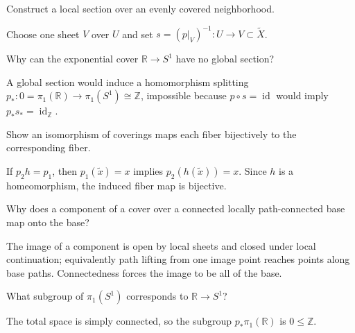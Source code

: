 \begin{problem}\label{prob:viii10-11}
Construct a local section over an evenly covered neighborhood.
\end{problem}
\begin{solution}
Choose one sheet \(V\) over \(U\) and set \(s=(p|_V)^{-1}:U\to V\subset\widetilde X\).
\end{solution}

\begin{problem}\label{prob:viii10-12}
Why can the exponential cover \(\mathbb R\to S^1\) have no global section?
\end{problem}
\begin{solution}
A global section would induce a homomorphism splitting \(p_*:0=\pi_1(\mathbb R)\to\pi_1(S^1)\cong\mathbb Z\), impossible because \(p\circ s=\operatorname{id}\) would imply \(p_*s_*=\operatorname{id}_{\mathbb Z}\).
\end{solution}

\begin{problem}\label{prob:viii10-13}
Show an isomorphism of coverings maps each fiber bijectively to the corresponding fiber.
\end{problem}
\begin{solution}
If \(p_2h=p_1\), then \(p_1(\tilde x)=x\) implies \(p_2(h(\tilde x))=x\).  Since \(h\) is a homeomorphism, the induced fiber map is bijective.
\end{solution}

\begin{problem}\label{prob:viii10-14}
Why does a component of a cover over a connected locally path-connected base map onto the base?
\end{problem}
\begin{solution}
The image of a component is open by local sheets and closed under local continuation; equivalently path lifting from one image point reaches points along base paths. Connectedness forces the image to be all of the base.
\end{solution}

\begin{problem}\label{prob:viii10-15}
What subgroup of \(\pi_1(S^1)\) corresponds to \(\mathbb R\to S^1\)?
\end{problem}
\begin{solution}
The total space is simply connected, so the subgroup \(p_*\pi_1(\mathbb R)\) is \(0\le\mathbb Z\).
\end{solution}

